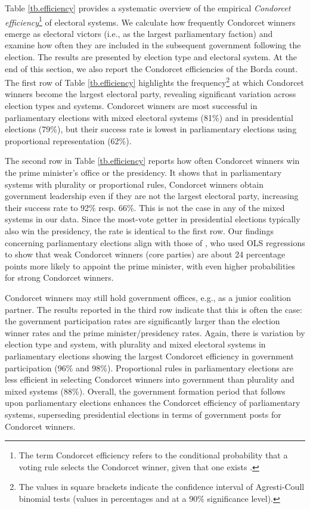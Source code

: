 \documentclass[12pt]{scrartcl}
\begin{document}
Table \ref{tb.efficiency} provides a systematic overview of the empirical \textit{Condorcet efficiency}\footnote{
    The term Condorcet efficiency refers to the conditional probability that a voting rule selects the Condorcet winner, given that one exists \citep{Gehrlein1998}.
} of electoral systems. We calculate how frequently Condorcet winners emerge as electoral victors (i.e., as the largest parliamentary faction) and examine how often they are included in the subsequent government following the election. The results are presented by election type and electoral system. At the end of this section, we also report the Condorcet efficiencies of the Borda count. The first row of Table \ref{tb.efficiency} highlights the frequency\footnote{
    The values in square brackets indicate the confidence interval of Agresti-Coull binomial tests \citep{Agresti1998} (values in percentages and at a 90\% significance level).
} at which Condorcet winners become the largest electoral party, revealing significant variation across election types and systems. Condorcet winners are most successful in  parliamentary elections with mixed electoral systems (81\%) and in presidential elections (79\%), but their success rate is lowest in parliamentary elections using proportional representation (62\%). 


 
The second row in Table \ref{tb.efficiency} reports how often Condorcet winners win the prime minister's office or the presidency. It shows that in parliamentary systems with plurality or proportional rules, Condorcet winners obtain government leadership even if they are not the largest electoral party, increasing their success rate to 92\% resp. 66\%. This is not the case in any of the mixed systems in our data.  Since the most-vote getter in presidential elections typically also win the presidency, the rate is identical to the first row. Our findings concerning parliamentary elections align with those of \cite{Desai2025}, who used OLS regressions to show that weak Condorcet winners (core parties) are about 24 percentage points more likely to appoint the prime minister, with even higher probabilities for strong Condorcet winners.

Condorcet winners may still hold government offices, e.g., as a junior coalition partner. The results reported in the third row indicate that this is often the case: the government participation rates are significantly larger than the election winner rates and the prime minister/presidency rates. Again, there is variation by election type and system, with plurality and mixed electoral systems in parliamentary elections showing the largest Condorcet efficiency in government participation (96\% and 98\%). Proportional rules in parliamentary elections are less efficient in selecting Condorcet winners into government than plurality and mixed systems (88\%). Overall, the government formation period that follows upon parliamentary elections enhances the Condorcet efficiency of parliamentary systems, superseding presidential elections in terms of government posts for Condorcet winners.
\end{document}
